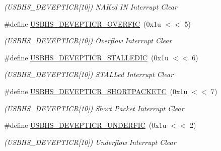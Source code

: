 \begin{DoxyCompactItemize}
\begin{DoxyCompactList}\small\item\em (U\+S\+B\+H\+S\+\_\+\+D\+E\+V\+E\+P\+T\+I\+CR\mbox{[}10\mbox{]}) N\+A\+Ked IN Interrupt Clear \end{DoxyCompactList}\item 
\mbox{\label{group__SAMV71__USBHS_ga86269e7c828e6f56daa4d6d164cba205}} 
\#define \mbox{\hyperlink{group__SAMV71__USBHS_ga86269e7c828e6f56daa4d6d164cba205}{U\+S\+B\+H\+S\+\_\+\+D\+E\+V\+E\+P\+T\+I\+C\+R\+\_\+\+O\+V\+E\+R\+F\+IC}}~(0x1u $<$$<$ 5)
\begin{DoxyCompactList}\small\item\em (U\+S\+B\+H\+S\+\_\+\+D\+E\+V\+E\+P\+T\+I\+CR\mbox{[}10\mbox{]}) Overflow Interrupt Clear \end{DoxyCompactList}\item 
\mbox{\label{group__SAMV71__USBHS_gaa8e26b5bde4aa55a5ccbf652d66eb58c}} 
\#define \mbox{\hyperlink{group__SAMV71__USBHS_gaa8e26b5bde4aa55a5ccbf652d66eb58c}{U\+S\+B\+H\+S\+\_\+\+D\+E\+V\+E\+P\+T\+I\+C\+R\+\_\+\+S\+T\+A\+L\+L\+E\+D\+IC}}~(0x1u $<$$<$ 6)
\begin{DoxyCompactList}\small\item\em (U\+S\+B\+H\+S\+\_\+\+D\+E\+V\+E\+P\+T\+I\+CR\mbox{[}10\mbox{]}) S\+T\+A\+L\+Led Interrupt Clear \end{DoxyCompactList}\item 
\mbox{\label{group__SAMV71__USBHS_ga157a85d1247175cdabb46c823d30dcc7}} 
\#define \mbox{\hyperlink{group__SAMV71__USBHS_ga157a85d1247175cdabb46c823d30dcc7}{U\+S\+B\+H\+S\+\_\+\+D\+E\+V\+E\+P\+T\+I\+C\+R\+\_\+\+S\+H\+O\+R\+T\+P\+A\+C\+K\+E\+TC}}~(0x1u $<$$<$ 7)
\begin{DoxyCompactList}\small\item\em (U\+S\+B\+H\+S\+\_\+\+D\+E\+V\+E\+P\+T\+I\+CR\mbox{[}10\mbox{]}) Short Packet Interrupt Clear \end{DoxyCompactList}\item 
\mbox{\label{group__SAMV71__USBHS_ga62fa84e30ca3a2de864ec235f99b1fb2}} 
\#define \mbox{\hyperlink{group__SAMV71__USBHS_ga62fa84e30ca3a2de864ec235f99b1fb2}{U\+S\+B\+H\+S\+\_\+\+D\+E\+V\+E\+P\+T\+I\+C\+R\+\_\+\+U\+N\+D\+E\+R\+F\+IC}}~(0x1u $<$$<$ 2)
\begin{DoxyCompactList}\small\item\em (U\+S\+B\+H\+S\+\_\+\+D\+E\+V\+E\+P\+T\+I\+CR\mbox{[}10\mbox{]}) Underflow Interrupt Clear \end{DoxyCompactList}\item 

\end{DoxyCompactItemize}

